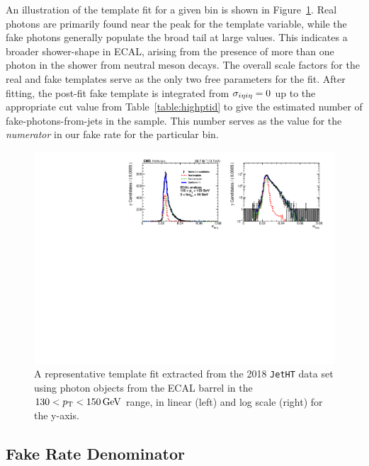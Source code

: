 An illustration of the template fit for a given \pt bin is shown in Figure~\ref{fig:templatefit}. Real photons are primarily found near the peak for the \sieie template variable, while the fake photons generally populate the broad tail at large \sieie values. This indicates a broader shower-shape in ECAL, arising from the presence of more than one photon in the shower from neutral meson decays. The overall scale factors for the real and fake templates serve as the only two free parameters for the fit. After fitting, the post-fit fake template is integrated from $\sigma_{i\eta i\eta}=0$ up to the appropriate cut value from Table~\ref{table:highptid} to give the estimated number of fake-photons-from-jets in the sample. This number serves as the value for the \emph{numerator} in our fake rate for the particular \pt bin. 

\begin{figure}[!htbp]
\centering
\includegraphics[scale=0.80]{fig/fakeRatePlot_jetht_2018_EE_pT130To150_chIso5To10.pdf}
\caption{A representative template fit extracted from the 2018 \texttt{JetHT} data set using photon objects from the ECAL barrel in the $130<p_{\mathrm{T}}<150\,\text{Ge\hspace{-.08em}V}$ range, in linear (left) and log scale (right) for the y-axis.}
\label{fig:templatefit}
\end{figure}

\subsection{Fake Rate Denominator}

